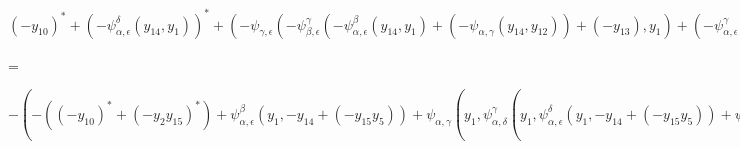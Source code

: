 \documentclass[a4paper,landscape]{article}
\begin{document}
$ (-y_{10})^*+(-\psi_{\alpha,\epsilon}^\delta(y_{14},y_1))^*+(-\psi_{\gamma,\epsilon}(-\psi_{\beta,\epsilon}^\gamma(-\psi_{\alpha,\epsilon}^\beta(y_{14},y_1)+(-\psi_{\alpha,\gamma}(y_{14},y_{12}))+(-y_{13}),y_1)+(-\psi_{\alpha,\epsilon}^\gamma(y_{14},y_1))+y_{12},y_1))^*+(-\psi_{\beta,\epsilon}^\delta(-\psi_{\alpha,\epsilon}^\beta(y_{14},y_1)+(-\psi_{\alpha,\gamma}(y_{14},y_{12}))+(-y_{13}),y_1))^*+(-y_{15}(-(-(y_2)^*+\psi_{\alpha,\epsilon}^\beta(y_1,y_5)+\psi_{\alpha,\gamma}(y_1,\psi_{\alpha,\delta}^\gamma(y_1,\psi_{\alpha,\epsilon}^\delta(y_1,y_5)+\psi_{\gamma,\epsilon}(-y_3,y_5)+(-(y_4)^*))+\psi_{\alpha,\epsilon}^\gamma(y_1,y_5)+(-y_3))+\psi_{\alpha,\delta}^\beta(y_1,\psi_{\alpha,\epsilon}^\delta(y_1,y_5)+\psi_{\gamma,\epsilon}(-y_3,y_5)+(-(y_4)^*))))) $

\addvspace{0.5cm}
=

\addvspace{0.5cm}
$ -(-((-y_{10})^*+(-y_2y_{15})^*)+\psi_{\alpha,\epsilon}^\beta(y_1,-y_{14}+(-y_{15}y_5))+\psi_{\alpha,\gamma}(y_1,\psi_{\alpha,\delta}^\gamma(y_1,\psi_{\alpha,\epsilon}^\delta(y_1,-y_{14}+(-y_{15}y_5))+\psi_{\gamma,\epsilon}(-\psi_{\beta,\epsilon}^\delta((-y_6)^*+(-y_4y_{10})^*,y_{15})+\psi_{\alpha,\epsilon}^\delta(y_3,y_{15})+\psi_{\gamma,\epsilon}(-\psi_{\beta,\epsilon}^\delta((y_7)^*,y_{10})+\psi_{\alpha,\epsilon}^\delta(y_5,y_{10})+\psi_{\gamma,\epsilon}(-y_8,y_{10})+(-(y_9)^*),y_{15})+(-(y_{12})^*),-y_{14}+(-y_{15}y_5))+(-(-((-\psi_{\alpha,\delta}^\beta(y_{15},-(y_7)^*+\psi_{\alpha,\epsilon}^\beta(y_5,y_{10})+\psi_{\alpha,\gamma}(y_5,\psi_{\alpha,\delta}^\gamma(y_5,\psi_{\alpha,\epsilon}^\delta(y_5,y_{10})+\psi_{\gamma,\epsilon}(-y_8,y_{10})+(-(y_9)^*))+\psi_{\alpha,\epsilon}^\gamma(y_5,y_{10})+(-y_8))+\psi_{\alpha,\delta}^\beta(y_5,\psi_{\alpha,\epsilon}^\delta(y_5,y_{10})+\psi_{\gamma,\epsilon}(-y_8,y_{10})+(-(y_9)^*))))^*+(-\psi_{\alpha,\epsilon}^\beta(y_{15},y_4))^*+(-\psi_{\alpha,\gamma}(y_{15},-y_{11}+(-y_5y_{12})))^*+(-y_{13})^*))^*))+\psi_{\alpha,\epsilon}^\gamma(y_1,-y_{14}+(-y_{15}y_5))+(-\psi_{\beta,\epsilon}^\delta((-y_6)^*+(-y_4y_{10})^*,y_{15})+\psi_{\alpha,\epsilon}^\delta(y_3,y_{15})+\psi_{\gamma,\epsilon}(-\psi_{\beta,\epsilon}^\delta((y_7)^*,y_{10})+\psi_{\alpha,\epsilon}^\delta(y_5,y_{10})+\psi_{\gamma,\epsilon}(-y_8,y_{10})+(-(y_9)^*),y_{15})+(-(y_{12})^*)))+\psi_{\alpha,\delta}^\beta(y_1,\psi_{\alpha,\epsilon}^\delta(y_1,-y_{14}+(-y_{15}y_5))+\psi_{\gamma,\epsilon}(-\psi_{\beta,\epsilon}^\delta((-y_6)^*+(-y_4y_{10})^*,y_{15})+\psi_{\alpha,\epsilon}^\delta(y_3,y_{15})+\psi_{\gamma,\epsilon}(-\psi_{\beta,\epsilon}^\delta((y_7)^*,y_{10})+\psi_{\alpha,\epsilon}^\delta(y_5,y_{10})+\psi_{\gamma,\epsilon}(-y_8,y_{10})+(-(y_9)^*),y_{15})+(-(y_{12})^*),-y_{14}+(-y_{15}y_5))+(-(-((-\psi_{\alpha,\delta}^\beta(y_{15},-(y_7)^*+\psi_{\alpha,\epsilon}^\beta(y_5,y_{10})+\psi_{\alpha,\gamma}(y_5,\psi_{\alpha,\delta}^\gamma(y_5,\psi_{\alpha,\epsilon}^\delta(y_5,y_{10})+\psi_{\gamma,\epsilon}(-y_8,y_{10})+(-(y_9)^*))+\psi_{\alpha,\epsilon}^\gamma(y_5,y_{10})+(-y_8))+\psi_{\alpha,\delta}^\beta(y_5,\psi_{\alpha,\epsilon}^\delta(y_5,y_{10})+\psi_{\gamma,\epsilon}(-y_8,y_{10})+(-(y_9)^*))))^*+(-\psi_{\alpha,\epsilon}^\beta(y_{15},y_4))^*+(-\psi_{\alpha,\gamma}(y_{15},-y_{11}+(-y_5y_{12})))^*+(-y_{13})^*))^*))) $
\end{document}
